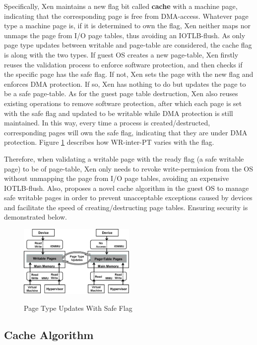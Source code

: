 Specifically, Xen maintains a new flag bit called \textbf{cache} with a machine page, indicating that the corresponding page is free from DMA-access. Whatever page type a machine page is, if it is determined to own the flag, Xen neither maps nor unmaps the page from I/O page tables, thus avoiding an IOTLB-flush. As only page type updates between writable and page-table are considered, the cache flag is along with the two types. If guest OS creates a new page-table, Xen firstly reuses the validation process to enforce software protection, and then checks if the specific page has the safe flag. If not, Xen sets the page with the new flag and enforces DMA protection. If so, Xen has nothing to do but updates the page to be a safe page-table. As for the guest page table destruction, Xen also reuses existing operations to remove software protection, after which each page is set with the safe flag and updated to be writable while DMA protection is still maintained. In this way, every time a process is created/destructed, corresponding pages will own the safe flag, indicating that they are under DMA protection. Figure \ref{fig:safe-flag} describes how WR-inter-PT varies with the flag.

Therefore, when validating a writable page with the ready flag (a safe writable page) to be of page-table, Xen only needs to revoke write-permission from the OS without unmapping the page from I/O page tables, avoiding an expensive IOTLB-flush. Also, \name proposes a novel cache algorithm in the guest OS to manage safe writable pages in order to prevent unacceptable exceptions caused by devices and facilitate the speed of creating/destructing page tables.
Ensuring security is demonstrated below.

\begin{figure}[ht]
\centering
\includegraphics[width=0.5\textwidth]{image/background/wr2pt.png} \\
\caption{Page Type Updates With Safe Flag}
\label{fig:safe-flag}
\end{figure}

\subsection{Cache Algorithm}



